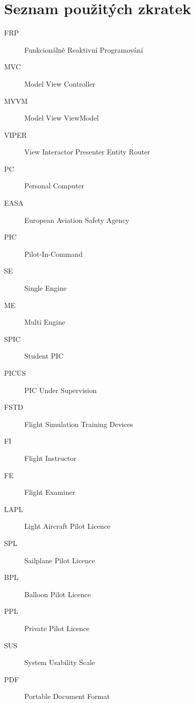 \documentclass[thesis=M,czech]{FITthesis}[2012/06/26]
\begin{document}



\appendix

\chapter{Seznam použitých zkratek}
\begin{description}
	\item[FRP] Funkcionálně Reaktivní Programování
	\item[MVC] Model View Controller
	\item[MVVM] Model View ViewModel
	\item[VIPER] View Interactor Presenter Entity Router
	\item[PC] Personal Computer
	\item[EASA] European Aviation Safety Agency
	\item[PIC] Pilot-In-Command
	\item[SE] Single Engine
	\item[ME] Multi Engine
	\item[SPIC] Student PIC
	\item[PICUS] PIC Under Supervision
	\item[FSTD] Flight Simulation Training Devices
	\item[FI] Flight Instructor
	\item[FE] Flight Examiner
	\item[LAPL] Light Aircraft Pilot Licence
	\item[SPL] Sailplane Pilot Licence
	\item[BPL] Balloon Pilot Licence
	\item[PPL] Private Pilot Licence
	\item[SUS] System Usability Scale
	\item [PDF] Portable Document Format
\end{description}
\end{document}
